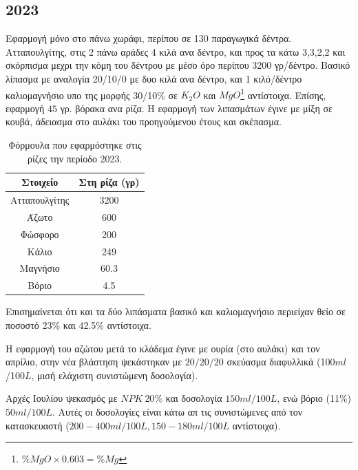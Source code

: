 \documentclass[12pt,a4paper]{article}
\begin{document}
\subsection{2023}
Εφαρμογή μόνο στο πάνω χωράφι, περίπου σε 130 παραγωγικά δέντρα. Ατταπουλγίτης, στις 2 πάνω αράδες 4 κιλά ανα δέντρο, και προς τα κάτω 3,3,2,2 και σκόρπισμα μεχρι την κόμη του δέντρου με μέσο όρο περίπου 3200 γρ/δέντρο. Βασικό λίπασμα με αναλογία 20/10/0 με δυο κιλά ανα δέντρο, και  1 κιλό/δέντρο καλιομαγνήσιο υπο της μορφής 30/10\% σε $K_2O$ και $MgO$\footnote{$\%MgO\times 0.603 = \%Mg$} αντίστοιχα. Επίσης, εφαρμογή $45$ γρ. βόρακα ανα ρίζα. Η εφαρμογή των λιπασμάτων έγινε με μίξη σε κουβά, άδειασμα στο αυλάκι του προηγούμενου έτους και σκέπασμα. 
\begin{table}[ht!]
	\centering
	\begin{tabular}{|c|c|}
		\hline
		\textbf{Στοιχείο} & \textbf{Στη ρίζα (γρ)}\\
		\hline 
		\hline
		Ατταπουλγίτης &  3200 \\ 
		\hline
		Άζωτο &  600 \\ 
		\hline 
		Φώσφορο &  200 \\ 
		\hline 
		Κάλιο &  249 \\ 
		\hline 
		Μαγνήσιο &  60.3 \\ 
		\hline 
		Βόριο &  4.5 \\ 
		\hline 
	\end{tabular} 
	\caption{Φόρμουλα που εφαρμόστηκε στις ρίζες την περίοδο 2023.}
\end{table}  
Επισημαίνεται ότι και τα δύο λιπάσματα βασικό και καλιομαγνήσιο περιείχαν θείο σε ποσοστό 23\% και 42.5\% αντίστοιχα.  

Η εφαρμογή του αζώτου μετά το κλάδεμα έγινε με ουρία (στο αυλάκι)  και τον απρίλιο, στην νέα βλάστηση ψεκάστηκαν με $20/20/20$ σκεύασμα διαφυλλικά (100$ml$/100$L$, μισή ελάχιστη συνιστώμενη δοσολογία). 

Αρχές Ιουλίου ψεκασμός με $NPK ~20\%$ και δοσολογία $150ml/100L$, ενώ βόριο (11\%)  $50ml/100L$. Αυτές οι δοσολογίες είναι κάτω απ τις συνιστώμενες από τον κατασκευαστή ($200-400 ml / 100 L, 150-180 ml / 100 L$ αντίστοιχα).
 
\end{document}

